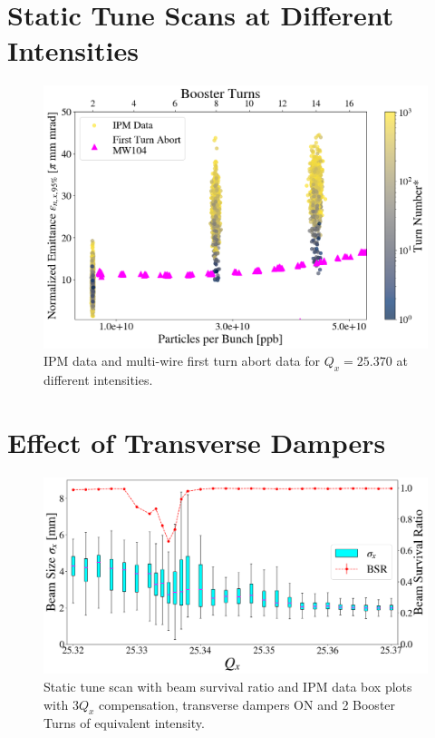 \section{Static Tune Scans at Different Intensities}

\begin{figure}[H]
    \centering
    \includegraphics[width=\columnwidth]{chapter6/25370_scatter.png}
    \caption{IPM data and multi-wire first turn abort data for $Q_x=25.370$ at different intensities.}
    \label{fig:25370_scatter}
\end{figure}


\section{Effect of Transverse Dampers}

\begin{figure}[H]
    \centering
    \includegraphics[width=\columnwidth]{chapter6/static2turns_ipm_dampersON.png}
    \caption{Static tune scan with beam survival ratio and IPM data box plots with $3Q_x$ compensation, transverse dampers ON and 2 Booster Turns of equivalent intensity.}
    \label{fig:static2_dampersON}
\end{figure}

